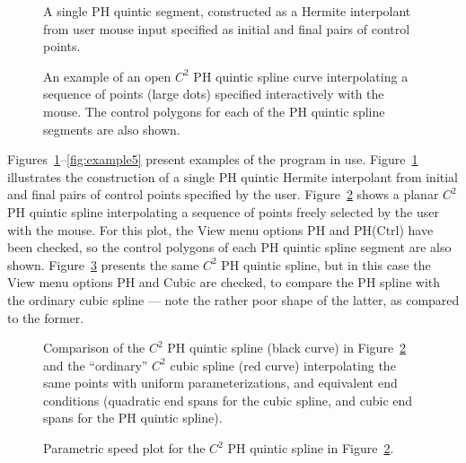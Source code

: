 \documentclass[12pt]{article}
\begin{document}
\begin{figure}[htbp]
\centering
{}\textwidth {}
\caption{A single PH quintic segment, constructed as a Hermite interpolant 
from user mouse input specified as initial and final pairs of control points.}
\label{fig:example1}
\end{figure}

\begin{figure}[htbp]
\centering
{}\textwidth {}
\caption{An example of an open $C^2$ PH quintic spline curve interpolating 
a sequence of points (large dots) specified interactively with the mouse.
The control polygons for each of the PH quintic spline segments are also 
shown.}
\label{fig:example2}
\end{figure}

Figures~\ref{fig:example1}--\ref{fig:example5} present examples of the 
program in use. Figure~\ref{fig:example1} illustrates the construction 
of a single PH quintic Hermite interpolant from initial and final pairs
of control points specified by the user. Figure~\ref{fig:example2} shows a 
planar $C^2$ PH quintic spline interpolating a sequence of points freely 
selected by the user with the mouse. For this plot, the View menu options 
PH and PH(Ctrl) have been checked, so the control polygons of each PH 
quintic spline segment are also shown. Figure~\ref{fig:example3} presents
the same $C^2$ PH quintic spline, but in this case the View menu options 
PH and Cubic are checked, to compare the PH spline with the ordinary cubic 
spline --- note the rather poor shape of the latter, as compared to the former. 

\begin{figure}
\centering
{}\textwidth {}
\caption{Comparison of the $C^2$ PH quintic spline (black curve) 
in Figure~\ref{fig:example2} and the ``ordinary'' $C^2$ cubic spline (red
curve) interpolating the same points with uniform parameterizations,
and equivalent end conditions (quadratic end spans for the cubic 
spline, and cubic end spans for the PH quintic spline).}
\label{fig:example3}
\end{figure}

\begin{figure}[htbp]
\centering
{}\textwidth {}
\caption{Parametric speed plot for the $C^2$ PH quintic spline in 
Figure~\ref{fig:example2}.} 
\label{fig:example4}
\end{figure}
\end{document}
